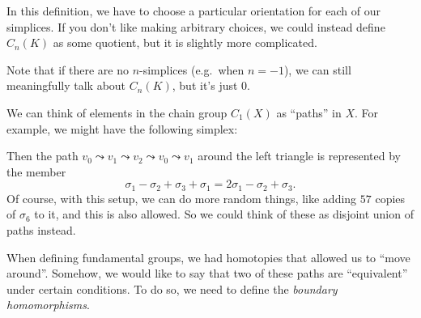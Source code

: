 \documentclass[a4paper]{article}
\begin{document}
In this definition, we have to choose a particular orientation for each of our simplices. If you don't like making arbitrary choices, we could instead define $C_n(K)$ as some quotient, but it is slightly more complicated.

Note that if there are no $n$-simplices (e.g.\ when $n = -1$), we can still meaningfully talk about $C_n(K)$, but it's just $0$.

\begin{eg}
  We can think of elements in the chain group $C_1(X)$ as ``paths'' in $X$. For example, we might have the following simplex:
  \begin{center}
  \end{center}
  Then the path $v_0 \leadsto v_1 \leadsto v_2 \leadsto v_0 \leadsto v_1$ around the left triangle is represented by the member
  \[
    \sigma_1 - \sigma_2 + \sigma_3 + \sigma_1 = 2\sigma_1 - \sigma_2 + \sigma_3.
  \]
  Of course, with this setup, we can do more random things, like adding $57$ copies of $\sigma_6$ to it, and this is also allowed. So we could think of these as disjoint union of paths instead.
\end{eg}

When defining fundamental groups, we had homotopies that allowed us to ``move around''. Somehow, we would like to say that two of these paths are ``equivalent'' under certain conditions. To do so, we need to define the \emph{boundary homomorphisms}.
\end{document}
